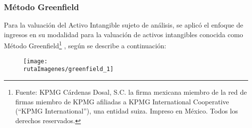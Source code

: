 \subsubsection{Método Greenfield}

Para la valuación del Activo Intangible sujeto de análisis, se aplicó el enfoque de ingresos en su modalidad para la valuación de activos intangibles conocida como \textcolor{principal}{Método Greenfield\footnote{Fuente: KPMG Cárdenas Dosal, S.C. la firma mexicana miembro de la red de firmas miembro de KPMG afiliadas a KPMG International Cooperative (``KPMG International''), una entidad suiza. Impreso en México. Todos los derechos reservados. }} , según se describe a continuación:


\begin{figure}[H]
\centering
\texttt{[image: \\rutaImagenes/greenfield\_1]}\\

\end{figure}
